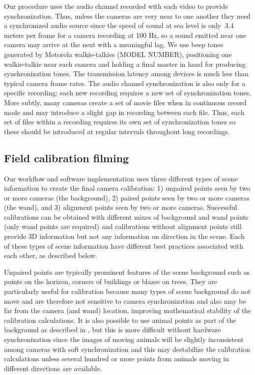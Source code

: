 \documentclass[fleqn,10pt]{wlpeerj}
\begin{document}
Our procedure uses the audio channel recorded with each video to provide synchronization. Thus, unless the cameras are very near to one another they need a synchronized audio source since the speed of sound at sea level is only $~$3.4 meters per frame for a camera recording at 100 Hz, so a sound emitted near one camera may arrive at the next with a meaningful lag. We use beep tones generated by Motorola walkie-talkies (MODEL NUMBER), positioning one walkie-talkie near each camera and holding a final master in hand for producing synchronization tones. The transmission latency among devices is much less than typical camera frame rates. The audio channel synchronization is also only for a specific recording; each new recording requires a new set of synchronization tones.  More subtly, many cameras create a set of movie files when in continuous record mode and may introduce a slight gap in recording between each file. Thus, each set of files within a recording requires its own set of synchronization tones so these should be introduced at regular intervals throughout long recordings.
 
\subsection*{Field calibration filming}
Our workflow and software implementation uses three different types of scene information to create the final camera calibration: 1) unpaired points seen by two or more cameras (the background), 2) paired points seen by two or more cameras (the wand), and 3) alignment points seen by two or more cameras. Successful calibrations can be obtained with different mixes of background and wand points (only wand points are required) and calibrations without alignment points still provide 3D information but not any information on direction in the scene. Each of these types of scene information have different best practices associated with each other, as described below.

Unpaired points are typically prominent features of the scene background such as points on the horizon, corners of buildings or blazes on trees. They are particularly useful for calibration because many types of scene background do not move and are therefore not sensitive to camera synchronization and also may be far from the camera (and wand) location, improving mathematical stability of the calibration calculations. It is also possible to use animal points as part of the background as described in \citep{Theriault:2014}, but this is more difficult without hardware synchronization since the images of moving animals will be slightly inconsistent among cameras with soft synchronization and this may destabilize the calibration calculations unless several hundred or more points from animals moving in different directions are available.
\end{document}
